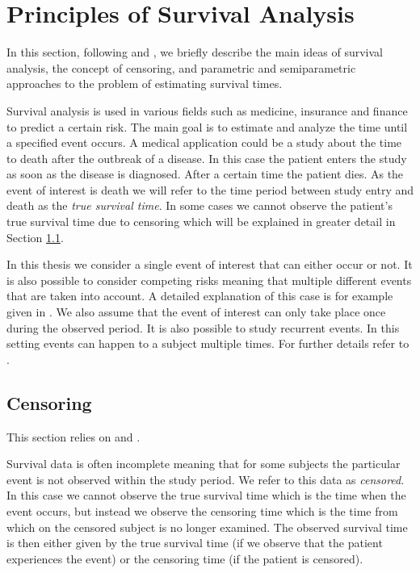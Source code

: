 \documentclass[12pt, a4paper]{scrartcl}
\theoremstyle{definition}
\theoremstyle{plain}
\numberwithin{equation}{section}
\numberwithin{figure}{section}
\numberwithin{table}{section}
\begin{document}
	\section{Principles of Survival Analysis}\label{sec:sa}
		
	In this section, following \citet*{sabook} and \citet*{mathsabook}, we briefly describe the main ideas of survival analysis, the concept of censoring, and parametric and semiparametric approaches to the problem of estimating survival times.
	
	Survival analysis is used in various fields such as medicine, insurance and finance to predict a certain risk.
	The main goal is to estimate and analyze the time until a specified event occurs.
	A medical application could be a study about the time to death after the outbreak of a disease.
	In this case the patient enters the study as soon as the disease is diagnosed.
	After a certain time the patient dies.
	As the event of interest is death we will refer to the time period between study entry and death as the \emph{true survival time}.
	In some cases we cannot observe the patient's true survival time due to censoring which will be explained in greater detail in Section \ref{censoring}.
	
	In this thesis we consider a single event of interest that can either occur or not.
	It is also possible to consider competing risks meaning that multiple different events that are taken into account.
	A detailed explanation of this case is for example given in \citet*[Chapter~8]{bookfailuretime}.
	We also assume that the event of interest can only take place once during the observed period.
	It is also possible to study recurrent events.
	In this setting events can happen to a subject multiple times.
	For further details refer to \citet*[Chapter~9]{bookfailuretime}.
	
	\subsection{Censoring} \label{censoring}
	
	This section relies on \citet*{sabook} and \citet*{mathsabook}.
	
	Survival data is often incomplete meaning that for some subjects the particular event is not observed within the study period.
	We refer to this data as \emph{censored}.
	In this case we cannot observe the true survival time which is the time when the event occurs, but instead we observe the censoring time which is the time from which on the censored subject is no longer examined.
	The observed survival time is then either given by the true survival time (if we observe that the patient experiences the event) or the censoring time (if the patient is censored).
	
\end{document}
